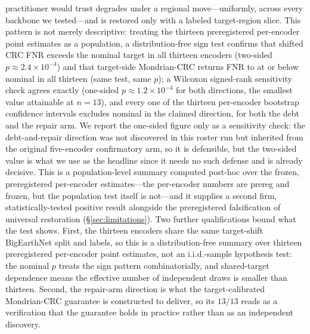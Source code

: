 \documentclass[11pt]{article}
\begin{document}
practitioner would trust degrades under a regional move---uniformly, across every backbone we tested---and
is restored only with a labeled target-region slice.
This pattern is not merely descriptive: treating the thirteen preregistered per-encoder point estimates
as a population, a distribution-free sign test confirms that shifted CRC FNR exceeds the nominal target
in all thirteen encoders (two-sided $p\approx2.4\times10^{-4}$) and that target-side Mondrian-CRC returns
FNR to at or below nominal in all thirteen (same test, same $p$); a Wilcoxon signed-rank sensitivity
check agrees exactly (one-sided $p\approx1.2\times10^{-4}$ for both directions, the smallest value
attainable at $n{=}13$), and every one of the thirteen per-encoder bootstrap confidence intervals
excludes nominal in the claimed direction, for both the debt and the repair arm. We report the
one-sided figure only as a sensitivity check: the debt-and-repair direction was not discovered in this
roster run but inherited from the original five-encoder confirmatory arm, so it is defensible, but the
two-sided value is what we use as the headline since it needs no such defense and is already decisive.
This is a population-level summary computed post-hoc over the frozen, preregistered per-encoder
estimates---the per-encoder numbers are prereg and frozen, but the population test itself is not---and
it supplies a second firm, statistically-tested positive result alongside the preregistered
falsification of universal restoration (\S\ref{sec:limitations}). Two further qualifications bound what the test shows.
First, the thirteen encoders share the same target-shift BigEarthNet split and labels, so this
is a distribution-free summary over thirteen preregistered per-encoder point estimates, not an
i.i.d.-sample hypothesis test: the nominal $p$ treats the sign pattern combinatorially, and
shared-target dependence means the effective number of independent draws is smaller than
thirteen. Second, the repair-arm direction is what the target-calibrated Mondrian-CRC
guarantee is constructed to deliver, so its $13/13$ reads as a verification that the guarantee
holds in practice rather than as an independent discovery.
\end{document}

